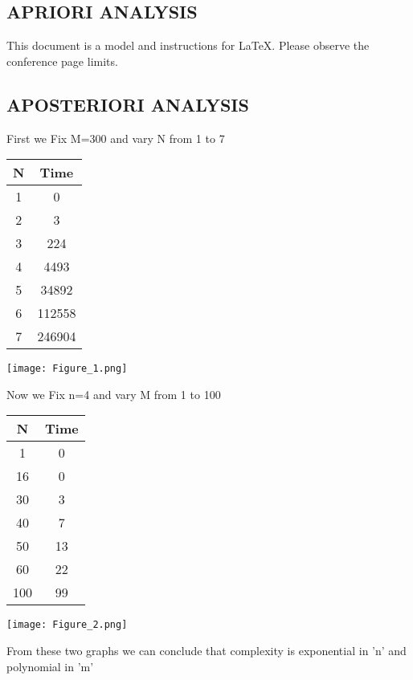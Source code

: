\documentclass[conference]{IEEEtran}
\begin{document}
\subsection{APRIORI ANALYSIS }

This document is a model and instructions for \LaTeX.
Please observe the conference page limits. 

\subsection{APOSTERIORI ANALYSIS }

First we Fix M=300 and vary N from 1 to 7
\begin{center}
   \begin{tabular}{|c|c|}
   \hline
   N & Time \\
   \hline\hline
    1 & 0 \\
    \hline
    2 & 3 \\
    \hline
    3 & 224 \\
    \hline
    4 & 4493 \\
    \hline
    5 & 34892 \\
    \hline
    6 & 112558 \\
    \hline
    7 & 246904 \\
    \hline
    \end{tabular} 
\end{center}

\texttt{[image: Figure\_1.png]}

Now we Fix n=4 and vary M from 1 to 100

\begin{center}
   \begin{tabular}{|c|c|}
   \hline
   N & Time \\
   \hline\hline
    1 & 0 \\
    \hline
    16 & 0 \\
    \hline
    30 & 3 \\
    \hline
    40 & 7 \\
    \hline
    50 & 13 \\
    \hline
    60 & 22 \\
    \hline
    100 & 99 \\
    \hline
    \end{tabular} 
\end{center}

\texttt{[image: Figure\_2.png]}


From these two graphs we can conclude that complexity is exponential in 'n' and polynomial in 'm'
\end{document}
